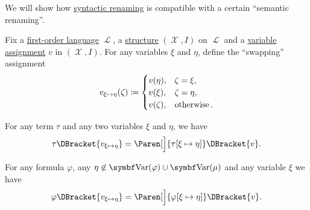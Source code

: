 \begin{proposition}\label{thm:swapping_assignment_compatibility}
  We will show how \hyperref[rem:first_order_substitution_renaming_justification]{syntactic renaming} is compatible with a certain \enquote{semantic renaming}.

  Fix a \hyperref[def:first_order_syntax]{first-order language} \( \mscrL \), a \hyperref[def:first_order_structure]{structure} \( (\mscrX, I) \) on \( \mscrL \) and a \hyperref[def:first_order_valuation/variable_assignment]{variable assignment} \( v \) in \( (\mscrX, I) \). For any variables \( \xi \) and \( \eta \), define the \enquote{swapping} assignment
  \begin{equation}\label{eq:thm:swapping_assignment_compatibility/swapping_assignment}
    v_{\xi \mapsto \eta}(\zeta) \coloneqq \begin{cases}
      v(\eta),  &\zeta = \xi, \\
      v(\xi),   &\zeta = \eta, \\
      v(\zeta), &\mathop{\text{otherwise}}.
    \end{cases}
  \end{equation}

  \begin{PropEnum}
     For any term \( \tau \) and any two variables \( \xi \) and \( \eta \), we have
    \begin{equation}\label{eq:thm:swapping_assignment_compatibility/terms}
      \tau\DBracket{v_{\xi \mapsto \eta}}
      =
      \Paren[\Big]{ \tau[\xi \mapsto \eta] }\DBracket{v}.
    \end{equation}

     For any formula \( \varphi \), any \( \eta \not\in \Bold{Var}(\varphi) \cup \Bold{Var}(\mu) \) and any variable \( \xi \) we have
    \begin{equation}\label{eq:thm:swapping_assignment_compatibility/formulas}
      \varphi\DBracket{v_{\xi \mapsto \eta}}
      =
      \Paren[\Big]{ \varphi[\xi \mapsto \eta] }\DBracket{v}.
    \end{equation}
  \end{PropEnum}
\end{proposition}
